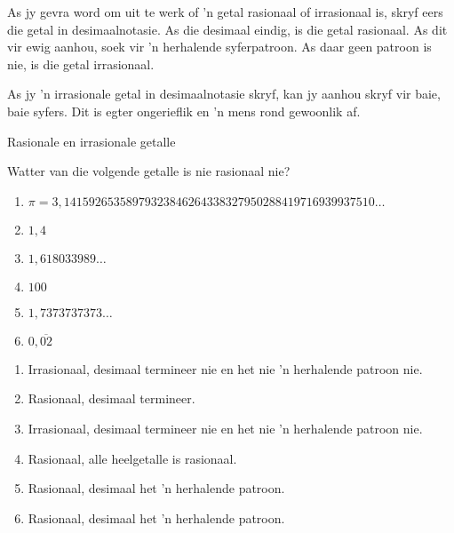 \par
As jy gevra word om uit te werk of ’n getal rasionaal of irrasionaal is, skryf eers die getal in desimaalnotasie. As die desimaal eindig, is die getal rasionaal. As dit vir ewig aanhou, soek vir ’n herhalende syferpatroon. As daar geen patroon is nie, is die getal irrasionaal.
\par 
As jy ’n irrasionale getal in desimaalnotasie skryf, kan jy aanhou skryf vir baie, baie
syfers. Dit is egter ongerieflik en ’n mens rond gewoonlik af.\par
\begin{wex}{Rasionale en irrasionale getalle}
{
\begin{minipage}{\textwidth}
Watter van die volgende getalle is nie rasionaal nie?\\

\begin{enumerate}[itemsep=5pt, label=\textbf{\arabic*}. ] 
\item $\pi =3,14159265358979323846264338327950288419716939937510\ldots$
\item $1,4$
\item $1,618033989\ldots$
\item $100$
\item $1,7373737373\ldots$
\item $0,\overline{02}$
\end{enumerate}
\end{minipage}
}
{
\begin{minipage}{\textwidth}
\begin{enumerate}[itemsep=5pt, label=\textbf{\arabic*}. ] 
\item Irrasionaal, desimaal termineer nie en het nie 'n herhalende patroon nie. 
\item Rasionaal, desimaal termineer.
\item Irrasionaal, desimaal termineer nie en het nie 'n herhalende patroon nie. 
\item Rasionaal, alle heelgetalle is rasionaal.
\item Rasionaal, desimaal het 'n herhalende patroon.
\item Rasionaal, desimaal het 'n herhalende patroon.
\end{enumerate}
\end{minipage}
}
\end{wex}

